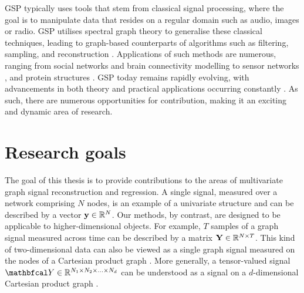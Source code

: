 \phantom{In this thesis we are  }
\vspace{-0.3cm}

GSP typically uses tools that stem from classical signal processing, where the goal is to manipulate data that resides on a regular domain such as audio, images or radio. GSP utilises spectral graph theory to generalise these classical techniques, leading to graph-based counterparts of algorithms such as filtering, sampling, and reconstruction \citep{Shuman2013}. Applications of such methods are numerous, ranging from social networks \citep{Dong2015} and brain connectivity modelling \citep{Huang2018} to sensor networks \citep{Zhu2012}, and protein structures \citep{Srivastava2023}. GSP today remains rapidly evolving, with advancements in both theory and practical applications occurring constantly \citep{Leus2023}. As such, there are numerous opportunities for contribution, making it an exciting and dynamic area of research. 

\section{Research goals}


The goal of this thesis is to provide contributions to the areas of multivariate graph signal reconstruction and regression. A single signal, measured over a network comprising $N$ nodes, is an example of a univariate structure and can be described by a vector $\mathbf{y} \in \mathbb{R}^N$. Our methods, by contrast, are designed to be applicable to higher-dimensional objects. For example, $T$ samples of a graph signal measured across time can be described by a matrix $\mathbf{Y} \in \mathbb{R}^{N \times T}$. This kind of two-dimensional data can also be viewed as a single graph signal measured on the nodes of a Cartesian product graph \citep{Imrich2000}. More generally, a tensor-valued signal $\Yt \in \R^{N_1 \times N_2 \times ... \times N_d}$ can be understood as a signal on a $d$-dimensional Cartesian product graph \citep{Stanley2020}. 



